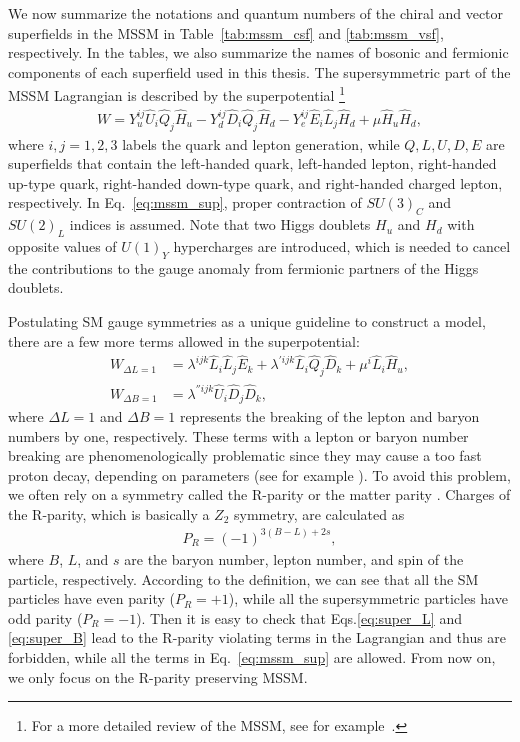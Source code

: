 \documentclass[12pt,twoside,book]{article}
\begin{document}
We now summarize the notations and quantum numbers of the chiral and vector superfields in the MSSM in Table~\ref{tab:mssm_csf} and \ref{tab:mssm_vsf}, respectively.
In the tables, we also summarize the names of bosonic and fermionic components of each superfield used in this thesis.
The supersymmetric part of the MSSM Lagrangian is described by the superpotential
\footnote{
  For a more detailed review of the MSSM, see for example~\cite{Martin:1997ns}.
}
\begin{align}
  W = Y_u^{i j} \hat{U}_i \hat{Q}_j \hat{H}_u - Y_d^{i j} \hat{D}_i \hat{Q}_j \hat{H}_d
  - Y_e^{i j} \hat{E}_i \hat{L}_j \hat{H}_d + \mu \hat{H}_u \hat{H}_d,
  \label{eq:mssm_sup}
\end{align}
where $i,j=1,2,3$ labels the quark and lepton generation, while $Q, L, U, D, E$ are superfields that contain the left-handed quark, left-handed lepton, right-handed up-type quark, right-handed down-type quark, and right-handed charged lepton, respectively.
In Eq.~\eqref{eq:mssm_sup}, proper contraction of $SU(3)_C$ and $SU(2)_L$ indices is assumed.
Note that two Higgs doublets $H_u$ and $H_d$ with opposite values of $U(1)_Y$ hypercharges are introduced, which is needed to cancel the contributions to the gauge anomaly from fermionic partners of the Higgs doublets.

Postulating SM gauge symmetries as a unique guideline to construct a model, there are a few more terms allowed in the superpotential:
\begin{align}
  W_{\Delta L=1} &= \lambda^{ijk} \hat{L}_i \hat{L}_j \hat{E}_k + \lambda^{'ijk} \hat{L}_i \hat{Q}_j \hat{D}_k
  + \mu^i \hat{L}_i \hat{H}_u, \label{eq:super_L} \\
  W_{\Delta B=1} &= \lambda^{''ijk} \hat{U}_i \hat{D}_j \hat{D}_k, \label{eq:super_B}
\end{align}
where $\Delta L=1$ and $\Delta B=1$ represents the breaking of the lepton and baryon numbers by one, respectively.
These terms with a lepton or baryon number breaking are phenomenologically problematic since they may cause a too fast proton decay, depending on parameters (see for example \cite{Sakai:1981pk}).
To avoid this problem, we often rely on a symmetry called the R-parity \cite{Farrar:1978xj} or the matter parity \cite{Dimopoulos:1981zb, Weinberg:1981wj, Sakai:1981pk, Dimopoulos:1981yj}.
Charges of the R-parity, which is basically a $Z_2$ symmetry, are calculated as
\begin{align}
  P_R = (-1)^{3(B-L)+2s},
\end{align}
where $B$, $L$, and $s$ are the baryon number, lepton number, and spin of the particle, respectively.
According to the definition, we can see that all the SM particles have even parity ($P_R = +1$), while all the supersymmetric particles have odd parity ($P_R = -1$).
Then it is easy to check that Eqs.\eqref{eq:super_L} and \eqref{eq:super_B} lead to the R-parity violating terms in the Lagrangian and thus are forbidden, while all the terms in Eq.~\eqref{eq:mssm_sup} are allowed.
From now on, we only focus on the R-parity preserving MSSM.
\end{document}
